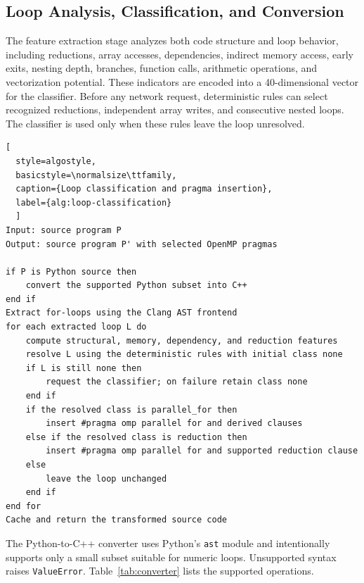 \documentclass[12pt,a4paper,oneside]{report}
\begin{document}
\subsection{Loop Analysis, Classification, and Conversion}

The feature extraction stage analyzes both code structure and loop behavior,
including reductions, array accesses, dependencies, indirect memory access,
early exits, nesting depth, branches, function calls, arithmetic operations, and
vectorization potential. These indicators are encoded into a 40-dimensional
vector for the classifier. Before any network request, deterministic rules can
select recognized reductions, independent array writes, and consecutive nested
loops. The classifier is used only when these rules leave the loop unresolved.

\noindent\begin{minipage}{\textwidth}
\begin{lstlisting}[
  style=algostyle,
  basicstyle=\normalsize\ttfamily,
  caption={Loop classification and pragma insertion},
  label={alg:loop-classification}
  ]
Input: source program P
Output: source program P' with selected OpenMP pragmas

if P is Python source then
    convert the supported Python subset into C++
end if
Extract for-loops using the Clang AST frontend
for each extracted loop L do
    compute structural, memory, dependency, and reduction features
    resolve L using the deterministic rules with initial class none
    if L is still none then
        request the classifier; on failure retain class none
    end if
    if the resolved class is parallel_for then
        insert #pragma omp parallel for and derived clauses
    else if the resolved class is reduction then
        insert #pragma omp parallel for and supported reduction clause
    else
        leave the loop unchanged
    end if
end for
Cache and return the transformed source code
\end{lstlisting}
\end{minipage}

The Python-to-C++ converter uses Python's \texttt{ast} module and intentionally
supports only a small subset suitable for numeric loops. Unsupported syntax
raises \texttt{ValueError}. Table~\ref{tab:converter} lists the supported
operations.
\end{document}
